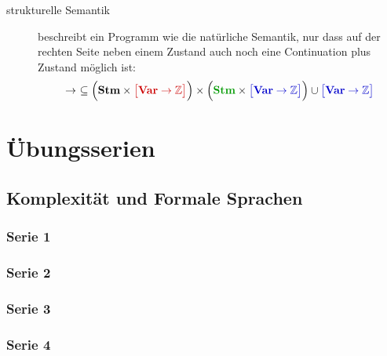 \documentclass[
  a4paper,
  11pt,
]{scrartcl}
\newcommand{\Z}{\mathbb{Z}}
\begin{document}
\begin{itemize}
\begin{description}
      \item[strukturelle Semantik] beschreibt ein Programm wie die natürliche
        Semantik, nur dass auf der rechten Seite neben einem
        \textcolor{myblue}{Zustand} auch noch eine
        \textcolor{mygreen}{Continuation} plus \textcolor{myblue}{Zustand}
        möglich ist:
        \begin{align*}
          \rightarrow \ \subseteq
          \Big(
          \textbf{Stm}
          \times
          \textcolor{myred}{\big[ \textbf{Var} \rightarrow \Z \big]}
          \Big)
          \times
          \Big(
          \textcolor{mygreen}{\textbf{Stm}}
          \times
          \textcolor{myblue}{\big[ \textbf{Var} \rightarrow \Z \big]}
          \Big)
          \cup
          \textcolor{myblue}{\big[ \textbf{Var} \rightarrow \Z \big]}
        \end{align*}
    \end{description}
\end{itemize}

\section{Übungsserien}

\subsection{Komplexität und Formale Sprachen}
\label{sub:komplexitat_und_formale_sprachen}

\subsubsection{Serie 1}
\label{sub:serie_1}




\subsubsection{Serie 2}
\label{sub:serie_2}




\subsubsection{Serie 3}
\label{sub:serie_3}




\subsubsection{Serie 4}
\label{sub:serie_4}
\end{document}
